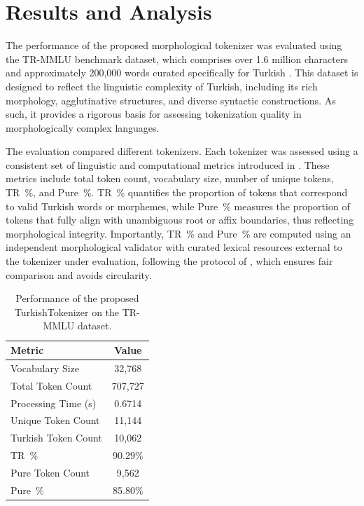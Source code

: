 \section{Results and Analysis}
\label{sec:results}

The performance of the proposed morphological tokenizer was evaluated using the TR-MMLU benchmark dataset, which comprises over 1.6 million characters and approximately 200,000 words curated specifically for Turkish \cite{bayram_setting_2025}. This dataset is designed to reflect the linguistic complexity of Turkish, including its rich morphology, agglutinative structures, and diverse syntactic constructions. As such, it provides a rigorous basis for assessing tokenization quality in morphologically complex languages.

The evaluation compared different tokenizers. Each tokenizer was assessed using a consistent set of linguistic and computational metrics introduced in \cite{bayram_tokenization_2025}. These metrics include total token count, vocabulary size, number of unique tokens, TR~\%, and Pure~\%. TR~\% quantifies the proportion of tokens that correspond to valid Turkish words or morphemes, while Pure~\% measures the proportion of tokens that fully align with unambiguous root or affix boundaries, thus reflecting morphological integrity. Importantly, TR~\% and Pure~\% are computed using an independent morphological validator with curated lexical resources external to the tokenizer under evaluation, following the protocol of \cite{bayram_tokenization_2025}, which ensures fair comparison and avoids circularity.

\begin{table}[H]
\centering
\caption{Performance of the proposed TurkishTokenizer on the TR-MMLU dataset.}
\label{tab:turkish_tokenizer_results}
\begin{tabular}{|l|c|}
\hline
\rowcolor[HTML]{DDDDDD}
\textbf{Metric} & \textbf{Value} \\ \hline
Vocabulary Size & 32,768 \\ \hline
Total Token Count & 707,727 \\ \hline
Processing Time (s) & 0.6714 \\ \hline
Unique Token Count & 11,144 \\ \hline
Turkish Token Count & 10,062 \\ \hline
TR~\% & 90.29\% \\ \hline
Pure Token Count & 9,562 \\ \hline
Pure~\% & 85.80\% \\ \hline
\end{tabular}
\end{table}

